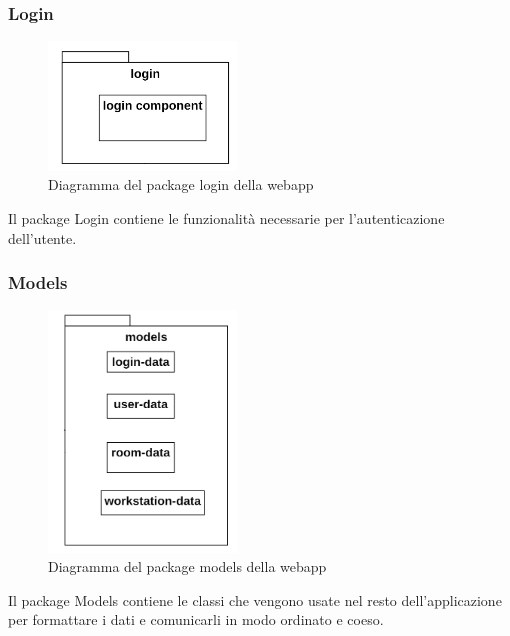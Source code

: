 \subsubsection{Login}
\begin{figure}[H]
	\centering
	\includegraphics[width=5cm]{res/images/webapp-login-diagrammaPackage.png}
	\caption{Diagramma del package login della webapp}
	\label{fig:DiagrammaPackageLoginWebapp}
\end{figure}
Il package Login contiene le funzionalità necessarie per l'autenticazione dell'utente.

\subsubsection{Models}
\begin{figure}[H]
	\centering
	\includegraphics[width=5cm]{res/images/webapp-models-diagrammaPackage.png}
	\caption{Diagramma del package models della webapp}
	\label{fig:DiagrammaPackageModelsWebapp}
\end{figure}
Il package Models contiene le classi che vengono usate nel resto dell'applicazione per formattare i dati e comunicarli in modo ordinato e coeso.

